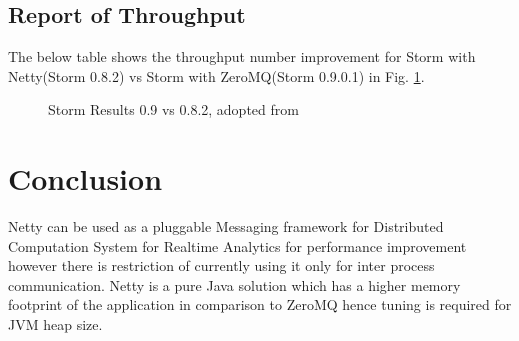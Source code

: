 \documentclass[9pt,twocolumn,twoside]{../../styles/osajnl}
\begin{document}
\subsection{Report of Throughput}
The below table shows the throughput number improvement for Storm with
Netty(Storm 0.8.2) vs Storm with ZeroMQ(Storm 0.9.0.1) in
Fig. \ref{fig:OfStreamsAndStorms}.

\begin{figure}[htbp]
	\centering
	\caption{Storm Results 0.9 vs 0.8.2, adopted from
          \cite[p.~27]{article-nabi2014streams}}
	\label{fig:OfStreamsAndStorms}
\end{figure}



\section{Conclusion}
Netty can be used as a pluggable Messaging framework for Distributed
Computation System for Realtime Analytics for performance improvement
however there is restriction of currently using it only for inter
process communication. Netty is a pure Java solution which has a
higher memory footprint of the application in comparison to ZeroMQ
hence tuning is required for JVM heap size.


 
\end{document}
